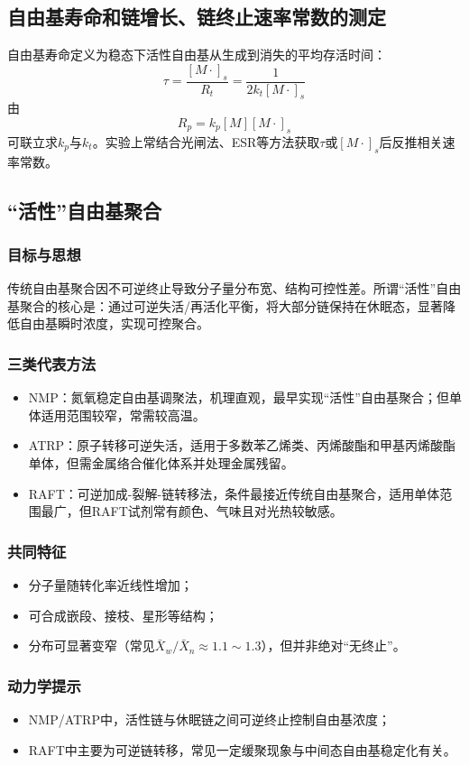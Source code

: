 ﻿\documentclass[12pt,a4paper]{article}
\begin{document}
\subsection{自由基寿命和链增长、链终止速率常数的测定}
自由基寿命定义为稳态下活性自由基从生成到消失的平均存活时间：
\[
\tau=\frac{[M\cdot]_s}{R_t}=\frac{1}{2k_t[M\cdot]_s}
\]
由
\[
R_p=k_p[M][M\cdot]_s
\]
可联立求$k_p$与$k_t$。实验上常结合光闸法、ESR等方法获取$\tau$或$[M\cdot]_s$后反推相关速率常数。

\subsection{“活性”自由基聚合}
\subsubsection{目标与思想}
传统自由基聚合因不可逆终止导致分子量分布宽、结构可控性差。所谓“活性”自由基聚合的核心是：通过可逆失活/再活化平衡，将大部分链保持在休眠态，显著降低自由基瞬时浓度，实现可控聚合。

\subsubsection{三类代表方法}
\begin{itemize}
  \item NMP：氮氧稳定自由基调聚法，机理直观，最早实现“活性”自由基聚合；但单体适用范围较窄，常需较高温。
  \item ATRP：原子转移可逆失活，适用于多数苯乙烯类、丙烯酸酯和甲基丙烯酸酯单体，但需金属络合催化体系并处理金属残留。
  \item RAFT：可逆加成-裂解-链转移法，条件最接近传统自由基聚合，适用单体范围最广，但RAFT试剂常有颜色、气味且对光热较敏感。
\end{itemize}

\subsubsection{共同特征}
\begin{itemize}
  \item 分子量随转化率近线性增加；
  \item 可合成嵌段、接枝、星形等结构；
  \item 分布可显著变窄（常见$\bar{X}_w/\bar{X}_n\approx1.1\sim1.3$），但并非绝对“无终止”。
\end{itemize}

\subsubsection{动力学提示}
\begin{itemize}
  \item NMP/ATRP中，活性链与休眠链之间可逆终止控制自由基浓度；
  \item RAFT中主要为可逆链转移，常见一定缓聚现象与中间态自由基稳定化有关。
\end{itemize}
\end{document}
